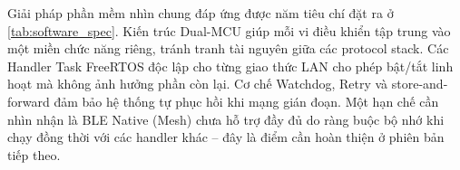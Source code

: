             Giải pháp phần mềm nhìn chung đáp ứng được năm tiêu chí đặt ra ở \ref{tab:software_spec}. Kiến trúc Dual-MCU giúp mỗi vi điều khiển tập trung vào một miền chức năng riêng, tránh tranh tài nguyên giữa các protocol stack. Các Handler Task FreeRTOS độc lập cho từng giao thức LAN cho phép bật/tắt linh hoạt mà không ảnh hưởng phần còn lại. Cơ chế Watchdog, Retry và store-and-forward đảm bảo hệ thống tự phục hồi khi mạng gián đoạn. Một hạn chế cần nhìn nhận là BLE Native (Mesh) chưa hỗ trợ đầy đủ do ràng buộc bộ nhớ khi chạy đồng thời với các handler khác -- đây là điểm cần hoàn thiện ở phiên bản tiếp theo.
            
    
